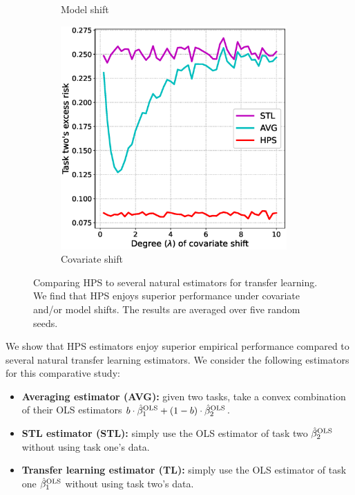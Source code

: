 \begin{figure}[!t]
\begin{subfigure}[b]{0.33\textwidth}
		\caption{Model shift}
		\label{fig_sec5_covariate}
	\end{subfigure}\hfill%
	\begin{subfigure}[b]{0.33\textwidth}
		\centering
		\includegraphics[width=0.95\textwidth]{figures/compare_risk_covariate_shift.eps}
		\caption{Covariate shift}
		\label{fig_sec5_covariate}
	\end{subfigure}	
	\caption{Comparing HPS to several natural estimators for transfer learning. We find that HPS enjoys superior performance under covariate and/or model shifts. The results are averaged over five random seeds.}
	\label{fig_sec51}
\end{figure}

We show that HPS estimators enjoy superior empirical performance compared to several natural transfer learning estimators.
We consider the following estimators for this comparative study:
\begin{itemize}
    \item {\bf Averaging estimator (AVG):} given two tasks, take a convex combination of their OLS estimators $b \cdot \hat{\beta}^{\textup{OLS}}_1 + (1 - b) \cdot \hat{\beta}^{\textup{OLS}}_2$.
    \item {\bf STL estimator (STL):} simply use the OLS estimator of task two $\hat{\beta}^{\textup{OLS}}_2$ without using task one's data.
    \item {\bf Transfer learning estimator (TL):} simply use the OLS estimator of task one $\hat{\beta}^{\textup{OLS}}_1$ without using task two's data.
\end{itemize}

